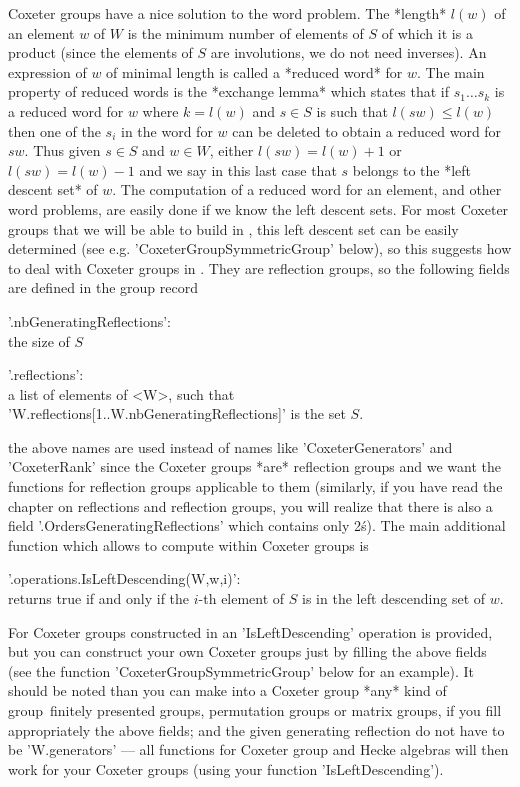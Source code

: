 Coxeter  groups  have  a  nice  solution  to the word problem. The *length*
$l(w)$ of an element $w$ of $W$ is the minimum number of elements of $S$ of
which it is a product (since the elements of $S$ are involutions, we do not
need inverses). An expression of $w$ of minimal length is called a *reduced
word*  for $w$. The main property of  reduced words is the *exchange lemma*
which  states that if $s_1\ldots s_k$ is a reduced word for $w$ where $k=l(w)$
and $s\in S$ is such that $l(sw)\le l(w)$ then one of the $s_i$ in the word
for  $w$ can be deleted to obtain a reduced word for $sw$. Thus given $s\in
S$ and $w\in W$, either $l(sw)=l(w)+1$ or $l(sw)=l(w)-1$ and we say in this
last  case  that  $s$  belongs  to  the  *left  descent  set*  of  $w$. The
computation  of a reduced word for an element, and other word problems, are
easily  done if we know the left descent sets. For most Coxeter groups that
we  will be able to  build in \CHEVIE, this  left descent set can be easily
determined  (see e.g. 'CoxeterGroupSymmetricGroup' below), so this suggests
how  to deal with Coxeter groups  in {\CHEVIE}. They are reflection groups,
so the following fields are defined in the group record\:

'.nbGeneratingReflections':\\ the size of $S$

'.reflections':\\ a list of elements of <W>, such
     that 'W.reflections{[1..W.nbGeneratingReflections]}' is the set $S$.

the above names  are used instead of names  like 'CoxeterGenerators' and
'CoxeterRank' since  the Coxeter groups  *are* reflection groups  and we
want the functions for reflection  groups applicable to them (similarly,
if you have  read the chapter on reflections and  reflection groups, you
will realize  that there is also  a field '.OrdersGeneratingReflections'
which contains only 2\'s). The  main additional function which allows to
compute within Coxeter groups is\:

'.operations.IsLeftDescending(W,w,i)':\\ returns true if and only if the
      $i$-th element of $S$ is in the left descending set of $w$.

For Coxeter groups constructed in {\CHEVIE} an 'IsLeftDescending' operation
is  provided, but you can construct your own Coxeter groups just by filling
the  above fields (see the  function 'CoxeterGroupSymmetricGroup' below for
an  example). It  should be  noted than  you can  make into a Coxeter group
*any*  kind of  group\:\ finitely  presented groups,  permutation groups or
matrix  groups, if you  fill appropriately the  above fields; and the given
generating  reflection do not  have to be  'W.generators' --- all functions
for Coxeter group and Hecke algebras will then work for your Coxeter groups
(using your function 'IsLeftDescending').

